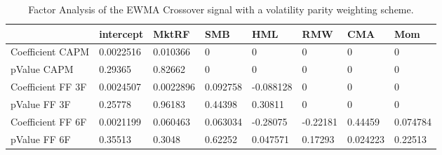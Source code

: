 \begin{table}[H]
\centering
\begin{tabular}{llllllll}
& intercept & MktRF & SMB & HML & RMW & CMA & Mom \\ 
\hline 
Coefficient CAPM & 0.0022516 & 0.010366 & 0 & 0 & 0 & 0 & 0 \\ 
pValue CAPM & 0.29365 & 0.82662 & 0 & 0 & 0 & 0 & 0 \\ 
Coefficient FF 3F & 0.0024507 & 0.0022896 & 0.092758 & -0.088128 & 0 & 0 & 0 \\ 
pValue FF 3F & 0.25778 & 0.96183 & 0.44398 & 0.30811 & 0 & 0 & 0 \\ 
Coefficient FF 6F & 0.0021199 & 0.060463 & 0.063034 & -0.28075 & -0.22181 & 0.44459 & 0.074784 \\ 
pValue FF 6F & 0.35513 & 0.3048 & 0.62252 & 0.047571 & 0.17293 & 0.024223 & 0.22513 \\ 
\hline
\end{tabular}
\caption{Factor Analysis of the EWMA Crossover signal with a volatility parity weighting scheme.}
\label{MBBSVPNR_FACTOR}
\end{table}